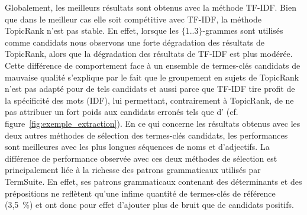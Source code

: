     Globalement, les meilleurs résultats sont obtenus avec la méthode TF-IDF.
    Bien que dans le meilleur cas elle soit compétitive avec TF-IDF, la méthode
    TopicRank n'est pas stable. En effet, lorsque les $\{1..3\}$-grammes sont
    utilisés comme candidats nous observons une forte dégradation des résultats
    de TopicRank, alors que la dégradation des résultats de TF-IDF est plus
    modérée. Cette différence de comportement face à un ensemble de termes-clés
    candidats de mauvaise qualité s'explique par le fait que le groupement en
    sujets de TopicRank n'est pas adapté pour de tels candidats et aussi parce
    que TF-IDF tire profit de la spécificité des mots (IDF), lui permettant,
    contrairement à TopicRank, de ne pas attribuer un fort poids aux candidats
    erronés tels que \og{}d'\fg{} (cf. figure~\ref{fig:exemple_extraction}). En
    ce qui concerne les résultats obtenus avec les deux autres méthodes de
    sélection des termes-clés candidats, les performances sont meilleures avec
    les plus longues séquences de noms et d'adjectifs. La différence de
    performance observée avec ces deux méthodes de sélection est principalement
    liée à la richesse des patrons grammaticaux utilisés par TermSuite. En
    effet, ses patrons grammaticaux contenant des déterminants et des
    prépositions ne reflètent qu'une infime quantité de termes-clés de référence
    (3,5~\%) et ont donc pour effet d'ajouter plus de bruit que de candidats
    positifs.
